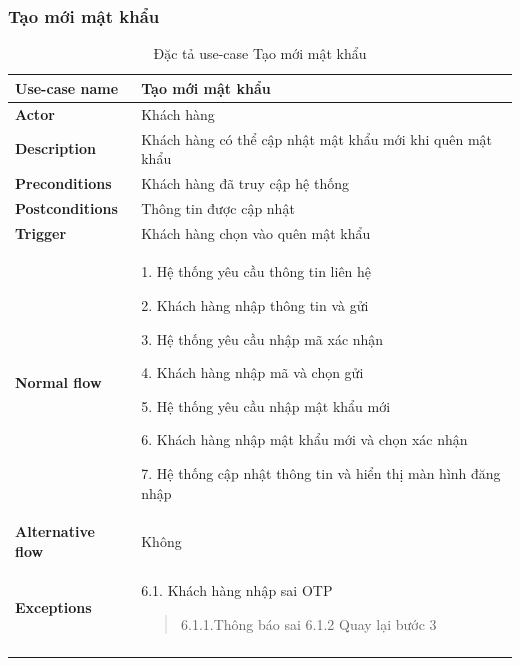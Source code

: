 \subsubsection{Tạo mới mật khẩu}
{
    \setlength\extrarowheight{6pt}
    \begin{longtable}{| p{} | p{} |}
        \hline
        \textbf{Use-case name}
         &
        Tạo mới mật khẩu
        \\
        \hline
        \textbf{Actor}
         &
        Khách hàng
        \\
        \hline
        \textbf{Description}
         &
        Khách hàng có thể cập nhật mật khẩu mới khi quên mật khẩu
        \\
        \hline
        \textbf{Preconditions}
         &
        Khách hàng đã truy cập hệ thống
        \\
        \hline
        \textbf{Postconditions}
         &
        Thông tin được cập nhật
        \\
        \hline
        \textbf{Trigger}
         &
        Khách hàng chọn vào quên mật khẩu
        \\
        \hline
        \begin{flushleft}
            \textbf{Normal flow}
        \end{flushleft}
         &
        1. Hệ thống yêu cầu thông tin liên hệ

        2. Khách hàng nhập thông tin và gửi

        3. Hệ thống yêu cầu nhập mã xác nhận

        4. Khách hàng nhập mã và chọn gửi

        5. Hệ thống yêu cầu nhập mật khẩu mới

        6. Khách hàng nhập mật khẩu mới và chọn xác nhận

        7. Hệ thống cập nhật thông tin và hiển thị màn hình đăng nhập
        \\
        \hline
        \textbf{Alternative flow}
         &
        Không
        \\
        \hline
        \textbf{Exceptions}
         &
        6.1.  Khách hàng nhập sai OTP
        \begin{quote}
            6.1.1.Thông báo sai
            6.1.2 Quay lại bước 3
        \end{quote}
        \\
        \hline
        \caption{Đặc tả use-case Tạo mới mật khẩu}
    \end{longtable}
}

